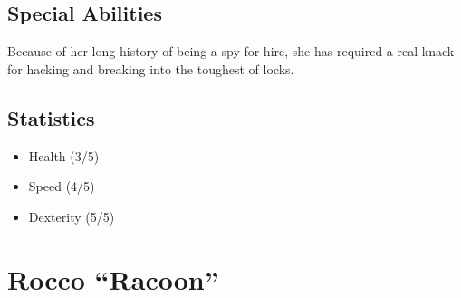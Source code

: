 \documentclass[10pt]{report}
\begin{document}
\begin{multicols}{2}
    \subsection{Special Abilities}
    
    Because of her long history of being a spy-for-hire, she has required a real knack for hacking and breaking into the toughest of locks.

    \subsection{Statistics}
    
    \begin{itemize}
        \item Health (3/5)
        \item Speed (4/5)
        \item Dexterity (5/5)
    \end{itemize}
\end{multicols}

\pagebreak

\section{Rocco ``Racoon''}
\end{document}
